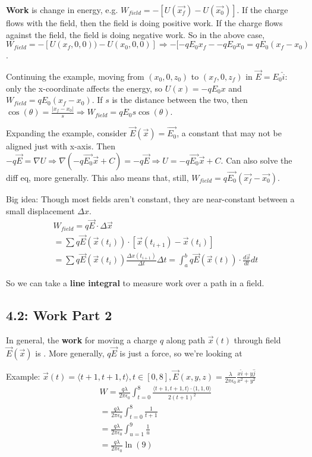 \documentclass[11pt, oneside]{article}   	%
\begin{document}
\textbf{Work} is change in energy, e.g. $W_{field} = -[U(\vec{x_f} )- U(\vec{x_0})]$.  If the charge flows with the field, then the field is doing positive work.  If the charge flows against the field, the field is doing negative work.  So in the above case, $W_{field} = -[U(x_f,0,0) )- U(x_0, 0, 0)]  \Rightarrow -[-qE_0x_f - -qE_0x_0 = qE_0(x_f - x_0)$.

Continuing the example, moving from $(x_0,0, z_0) $ to $(x_f,0, z_f)$ in $\vec{E} = E_0\hat{i}$: only the x-coordinate affects the energy, so $U(x) = -qE_0x$ and $W_{field} = qE_0(x_f - x_0)$.  If $s$ is the distance between the two, then $\cos(\theta) = \frac{|x_f - x_0|}{s} \Rightarrow W_{field} = qE_0 s \cos(\theta)$.

Expanding the example, consider $\vec{E}(\vec{x}) = \vec{E_0}$, a constant that may not be aligned just with x-axis.  Then $-q\vec{E} = \nabla U \Rightarrow \nabla (-q\vec{E_0} \vec{x} + C) = -q\vec{E} \Rightarrow U = -q \vec{E_0}\vec{x} +C.$ Can also solve the diff eq, more generally.  This also means that, still, $W_{field} = q\vec{E_0}(\vec{x_f} - \vec{x_0})$.

Big idea: Though most fields aren't constant, they are near-constant between a small displacement $\Delta x$.  
\begin{align}
W_{field} = q\vec{E} \cdot \Delta \vec{x} \\
= \sum q\vec{E}(\vec{x}(t_i)) \cdot [\vec{x}(t_{i+1}) - \vec{x}(t_i)] \\
= \sum q\vec{E}(\vec{x}(t_i)) \frac{\Delta x(t_{i+1})} {\Delta t}\Delta t 
= \int_a^b q \vec{E}(\vec{x}(t)) \cdot \frac{d\vec{x}}{dt}dt
\end{align}

So we can take a \textbf{line integral} to measure work over a path in a field.

\subsection{4.2: Work Part 2}

In general, the \textbf{work} for moving a charge $q$ along path $\vec{x}(t)$ through field $\vec{E}(\vec{x})$ is .  More generally, $q\vec{E}$ is just a force, so we're looking at 

Example: $\vec{x}(t) = \langle t+1, t+1, t \rangle, t \in [0, 8], \vec{E}(x,y,z) = \frac{\lambda}{2 \pi \epsilon_0} \frac{x \hat{i} + y \hat{j}}{x^2+y^2}$
\begin{align}
W = \frac{q \lambda}{2 \pi \epsilon_0} \int_{t=0}^8 \frac{\langle t+1, t+1, t\rangle \cdot \langle 1, 1, 0 \rangle}{2(t+1)^2} \\
=\frac{q \lambda}{2 \pi \epsilon_0} \int_{t=0}^8 \frac{1}{t+1} \\
= \frac{q \lambda}{2 \pi \epsilon_0} \int_{u=1}^9 \frac{1}{u}  \\
= \frac{q \lambda}{2 \pi \epsilon_0} \ln(9)
\end{align}
\end{document}
